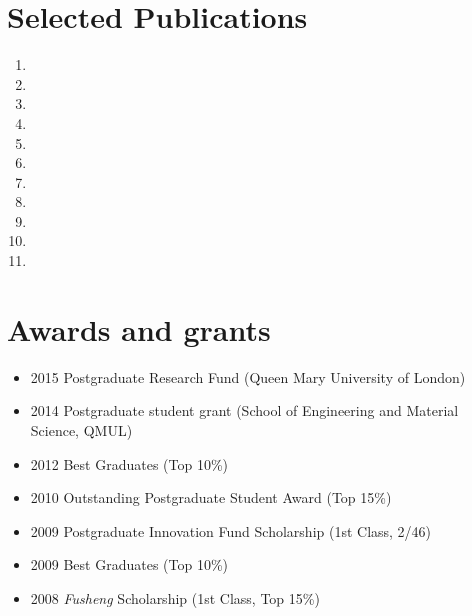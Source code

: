 \documentclass[letterpaper]{article}
\begin{document}
\vspace{-12pt}
\section*{Selected Publications}
\vspace{-10pt}




\begin{enumerate}
\item {}
\item {}
\item {}
\item {}
\item {}
\item {}
\item {}
\item {}
\item {}
\item {}
\item {}

\end{enumerate}


\vspace{-12pt}
\section*{Awards and grants}
\vspace{-10pt}
\begin{itemize}
\item 2015 Postgraduate Research Fund (Queen Mary University of London)
\item 2014 Postgraduate student grant (School of Engineering and Material Science, QMUL)
\item 2012 Best Graduates (Top 10\%)
\item 2010 Outstanding Postgraduate Student Award (Top 15\%)
\item 2009 Postgraduate Innovation Fund Scholarship (1st Class, 2/46)
\item 2009 Best Graduates (Top 10\%)
\item 2008 \textit{Fusheng} Scholarship (1st Class, Top 15\%)
\end{itemize}
\end{document}
